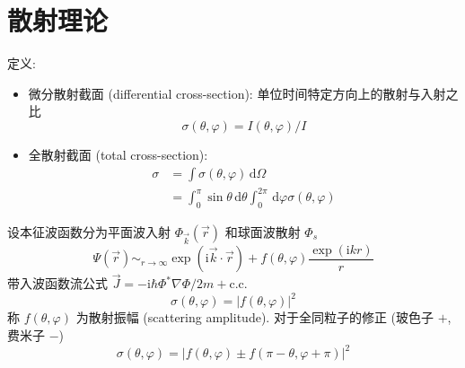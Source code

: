 \documentclass[10pt,a4paper,twocolumn]{article} %
\numberwithin{equation}{section} %
\newcommand{\dif}{\,\mathrm d}
\newcommand\mi{\mathrm{i}}
\newcommand\cc{\mathrm{c.c.}}
\begin{document}
\section{散射理论} %
\label{sec:scattering_theory}
定义: 
\begin{itemize}
	\item 微分散射截面 (differential cross-section): 
	单位时间特定方向上的散射与入射之比
	\begin{equation}
		\sigma(\theta, \varphi) = I(\theta, \varphi) / I
	\end{equation}
	\item 全散射截面 (total cross-section):
	\begin{align}
		\sigma &= \int\sigma(\theta, \varphi)\dif\Omega \\
		&= \int_0^\pi\sin\theta\dif\theta\int_0^{2\pi}\dif\varphi
		\sigma(\theta, \varphi)
	\end{align}
\end{itemize}
设本征波函数分为平面波入射 $\Phi_{\vec k}(\vec r)$ 和球面波散射 $\Phi_s$
\begin{equation}\label{equ:sca_form}
	\Psi(\vec r) \mathop{\sim}_{r\to\infty} \exp(\mi\vec k \cdot \vec r)
	+ f(\theta, \varphi)\frac{\exp(\mi kr)}{r}
\end{equation}
带入波函数流公式 $\vec J = -\mi\hbar\Phi^*\nabla\Phi/2m + \cc$ 
\begin{equation}\label{equ:sca_id}
	\sigma(\theta, \varphi) = |f(\theta, \varphi)|^2
\end{equation}
称 $f(\theta, \varphi)$ 为散射振幅 (scattering amplitude). 对于全同粒子的修正 
(玻色子 $+$, 费米子 $-$)
\begin{equation}
	\sigma(\theta, \varphi) = 
	|f(\theta, \varphi)\pm f(\pi - \theta, \varphi + \pi)|^2 
\end{equation}
\end{document}
